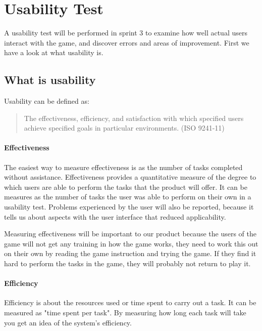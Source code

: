 \section{Usability Test}

	A usability test will be performed in sprint 3 to examine how well actual users interact with the game, and	discover errors and areas of improvement. First we have a look at what usability is.

\subsection{What is usability}

	Usability can be defined as:

	\begin{quote}
	The effectiveness, efficiency, and satisfaction with which specified users 
	achieve specified goals in particular environments. (ISO 9241-11) \cite{ISOusability}
	\end{quote}

	\paragraph{Effectiveness}

		The easiest way to measure effectiveness is as the number of tasks completed without assistance. Effectiveness provides a quantitative measure of the degree to which users are able to perform the tasks that the product will offer. It can be measures as the number of tasks the user was able to perform on their own in a usability test. Problems experienced by the user will also be reported, because it tells us about aspects with the user interface that reduced applicability.

		Measuring effectiveness will be important to our product because the users of the game will not get any training in how the game works, they need to work this out on their own by reading the game instruction and trying the game. If they find it hard to perform the tasks in the game, they will probably not return to play it.

	\paragraph{Efficiency}

		Efficiency is about the resources used or time spent to carry out a task. It can be measured as "time spent per task".
		By measuring how long each task will take you get an idea of the system's efficiency.

